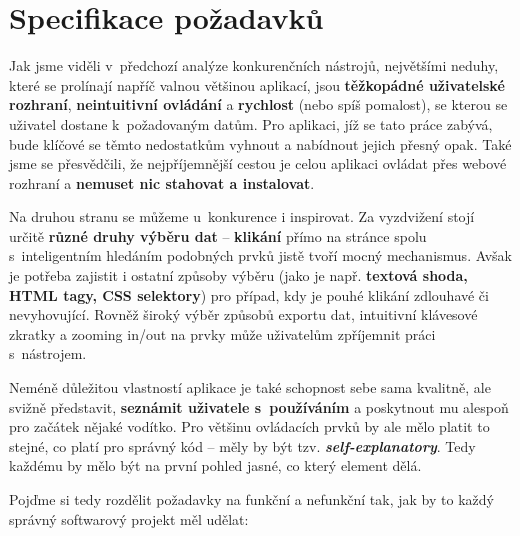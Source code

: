 \documentclass[thesis=B,czech]{FITthesis}[2012/06/26]
\begin{document}
\newpage
\section{Specifikace požadavků}
Jak jsme viděli v~předchozí analýze konkurenčních nástrojů, největšími neduhy, které se prolínají napříč valnou většinou aplikací, jsou \textbf{těžkopádné uživatelské rozhraní}, \textbf{neintuitivní ovládání} a \textbf{rychlost} (nebo spíš pomalost), se kterou se uživatel dostane k~požadovaným datům. Pro aplikaci, jíž se tato práce zabývá, bude klíčové se těmto nedostatkům vyhnout a nabídnout jejich přesný opak. Také jsme se přesvědčili, že nejpříjemnější cestou je celou aplikaci ovládat přes webové rozhraní a \textbf{nemuset nic stahovat a instalovat}.

Na druhou stranu se můžeme u~konkurence i inspirovat. Za vyzdvižení stojí určitě \textbf{různé druhy výběru dat} -- \textbf{klikání} přímo na stránce spolu s~inteligentním hledáním podobných prvků jistě tvoří mocný mechanismus. Avšak je potřeba zajistit i ostatní způsoby výběru (jako je např. \textbf{textová shoda, HTML tagy, CSS selektory}) pro případ, kdy je pouhé klikání zdlouhavé či nevyhovující. Rovněž široký výběr způsobů exportu dat, intuitivní klávesové zkratky a zooming in/out na prvky může uživatelům zpříjemnit práci s~nástrojem.

Neméně důležitou vlastností aplikace je také schopnost sebe sama kvalitně, ale svižně představit, \textbf{seznámit uživatele s~používáním} a poskytnout mu alespoň pro začátek nějaké vodítko. Pro většinu ovládacích prvků by ale mělo platit to stejné, co platí pro správný kód -- měly by být tzv. \textbf{\emph{self-explanatory}}. Tedy každému by mělo být na první pohled jasné, co který element dělá.

Pojďme si tedy rozdělit požadavky na funkční a nefunkční tak, jak by to každý správný softwarový projekt měl udělat:
\end{document}
